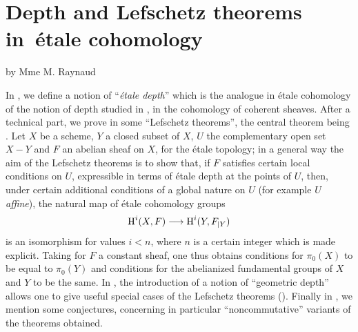 \chapter[Depth and Lefschetz theorems]
{Depth and Lefschetz theorems in~\'etale cohomology} \label{XIV}
\begin{center}
by Mme M. Raynaud
\end{center}

\vspace*{1cm}
In \numero {}, we define a notion of ``\emph{\'etale depth}'' which is the analogue in \'etale cohomology of the notion of depth studied in , in the cohomology of coherent sheaves. After a technical part, we prove in \numero {} some ``Lefschetz theorems'', the central theorem being . Let $X$ be a scheme, $Y$ a closed subset of $X$, $U$ the complementary open set $X-Y$ and $F$ an abelian sheaf on $X$, for the \'etale topology; in a general way the aim of the Lefschetz theorems is to show that, if $F$ satisfies certain local conditions on $U$, expressible in terms of \'etale depth at the points of $U$, then, under certain additional conditions of a global nature on $U$ (for example $U$ \emph{affine}), the natural map of \'etale cohomology groups
$$
\H^i(X, F)\to \H^i(Y, F_{|Y})$$
is an isomorphism for values $i<n$, where $n$ is a certain integer which is made explicit. Taking for $F$ a constant sheaf, one thus obtains conditions for $\pi_0(X)$ to be equal to $\pi_0(Y)$ and conditions for the abelianized fundamental groups of $X$ and $Y$ to be the same. In \numero {}, the introduction of a notion of ``geometric depth'' allows one to give useful special cases of the Lefschetz theorems (). Finally in \numero {}, we mention some conjectures, concerning in particular ``noncommutative'' variants of the theorems obtained.

